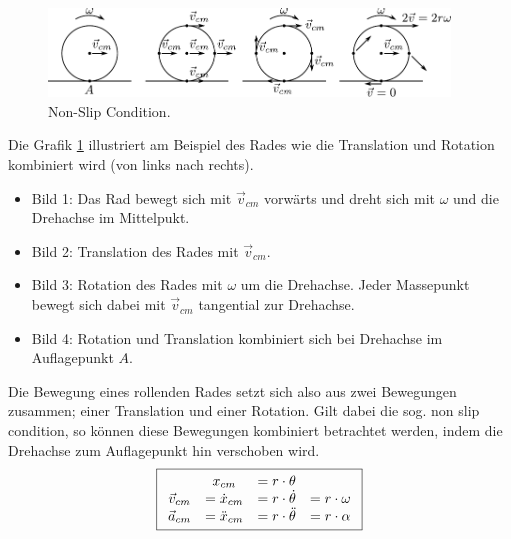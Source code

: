 \begin{figure}[h!]
	\centering
	\includegraphics[width=0.95\textwidth]{non-slip.pdf}
	\caption{Non-Slip Condition.}
	\label{fig:non-slip}
\end{figure}

\noindent
Die Grafik \ref{fig:non-slip} illustriert am Beispiel des Rades wie die 
Translation und Rotation kombiniert wird (von links nach rechts).
\begin{itemize}
	\item{Bild 1:} Das Rad bewegt sich mit $\vec{v}_{cm}$ vorwärts und
		dreht sich mit $\omega$ und die Drehachse im Mittelpukt.
	\item{Bild 2:} Translation des Rades mit $\vec{v}_{cm}$.
	\item{Bild 3:} Rotation des Rades mit $\omega$ um die Drehachse.
		Jeder Massepunkt bewegt sich dabei mit $\vec{v}_{cm}$
		tangential zur Drehachse.
	\item{Bild 4:} Rotation und Translation kombiniert sich bei
		Drehachse im Auflagepunkt $A$.
\end{itemize}
Die Bewegung eines rollenden Rades setzt sich also aus zwei Bewegungen
zusammen; einer Translation und einer Rotation. Gilt dabei die sog. 
non slip condition, so können diese Bewegungen kombiniert betrachtet 
werden, indem die Drehachse zum Auflagepunkt hin verschoben wird. 
\[ \boxed{\begin{array}{c c c c}
		& x_{cm} 
		&= r \cdot \theta 
		& \\
	\vec{v}_{cm} 
		&= \dot{x}_{cm} 
		&= r \cdot \dot{\theta }
		& =r \cdot \omega \\
	\vec{a}_{cm} 
		&= \ddot{x}_{cm}
		&= r \cdot \ddot{\theta}
		&= r \cdot \alpha
\end{array}}\]

